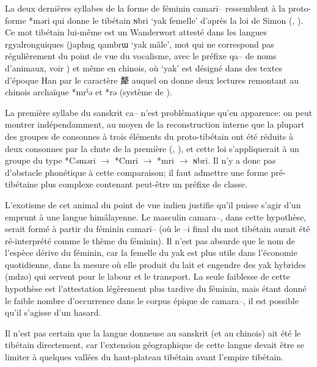 \documentclass[oldfontcommands,oneside,a4paper,11pt]{article}
\newcommand{\ipa}[1]{{\phon #1}} %
\newcommand{\zh}[1]{{\cn #1}}
\begin{document}
La deux dernières syllabes de la forme de féminin \ipa{camarī--} ressemblent à la proto-forme *\ipa{məri} qui donne le tibétain  \ipa{ɴbri} `yak femelle' d'après la loi de Simon (\citealt[187]{simon29}, \citealt{hill11laws}). Ce mot tibétain lui-même est un Wanderwort attesté dans les langues rgyalronguiques (japhug \ipa{qambrɯ} `yak mâle', mot qui ne correspond pas régulièrement du point de vue du vocalisme, avec le préfixe \ipa{qa--} de noms d'animaux, voir   \citealt[158-9]{jacques14snom}) et même en chinois, où  `yak' est désigné dans des textes d'époque Han par le caractère \zh{犛} auquel on donne deux lectures remontant au chinois archaïque *\ipa{mrˁə} et *\ipa{rə} (système de \citealt{bs14oc}).

La première syllabe du sanskrit \ipa{ca--} n'est problématique qu'en apparence: on peut montrer indépendamment, au moyen de la reconstruction interne que la plupart des groupes de consonnes à trois éléments du proto-tibétain ont été réduits à deux consonnes par la chute de la première (\citealt{coblin76}, \citealt{hill11laws}), et cette loi s'appliquerait à un groupe du type *\ipa{Cəməri} $\rightarrow$ *\ipa{Cmri} $\rightarrow$ *\ipa{mri} $\rightarrow$ \ipa{ɴbri}. Il n'y a donc pas d'obstacle phonétique à cette comparaison; il faut admettre une forme pré-tibétaine plus complexe contenant peut-être un préfixe de classe. 
  
L'exotisme de cet animal du point de vue indien justifie qu'il puisse s'agir d'un emprunt à une langue himâlayenne. Le masculin \ipa{camara--}, dans cette hypothèse, serait formé à partir du féminin \ipa{camarī--} (où le \ipa{--i} final du mot tibétain aurait été ré-interprété comme le thème du féminin). Il n'est pas absurde que le nom de l'espèce dérive du féminin, car la femelle du yak est plus utile dans l'économie quotidienne, dans la mesure où elle produit du lait et engendre des yak hybrides (\ipa{mdzo}) qui servent pour le labour et le transport. La seule faiblesse de cette hypothèse est l'attestation légèrement plus tardive du féminin, mais étant donné le faible nombre d'occurrence dans le corpus épique de \ipa{camara--}, il est possible qu'il s'agisse d'un hasard.

Il n'est pas certain que la langue donneuse au sanskrit (et au chinois) ait été le tibétain directement, car l'extension géographique de cette langue devait être se limiter à quelques vallées du haut-plateau tibétain avant l'empire tibétain. 
  


\end{document}
